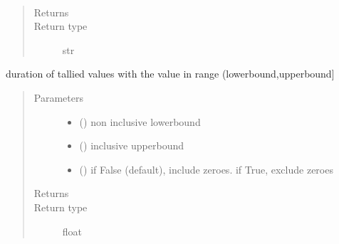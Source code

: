 \documentclass[letterpaper,10pt,english]{sphinxmanual}
\begin{document}
\begin{fulllineitems}
\begin{fulllineitems}
\label{\detokenize{Reference:salabim.MonitorTimestamp.base_name}}~\begin{quote}\begin{description}
\item[{Returns}] \leavevmode
{}

\item[{Return type}] \leavevmode
str

\end{description}\end{quote}

\end{fulllineitems}


\begin{fulllineitems}
\label{\detokenize{Reference:salabim.MonitorTimestamp.bin_duration}}
duration of tallied values with the value in range (lowerbound,upperbound{]}
\begin{quote}\begin{description}
\item[{Parameters}] \leavevmode\begin{itemize}
\item {} 
 () \textendash{} non inclusive lowerbound

\item {} 
 () \textendash{} inclusive upperbound

\item {} 
 () \textendash{} if False (default), include zeroes. if True, exclude zeroes

\end{itemize}

\item[{Returns}] \leavevmode
{}

\item[{Return type}] \leavevmode
float

\end{description}\end{quote}


\end{fulllineitems}
\end{fulllineitems}
\end{document}
